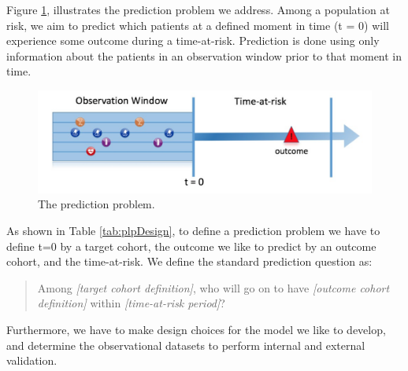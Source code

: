 \documentclass[11pt]{book}
\theoremstyle{definition}
\theoremstyle{definition}
\theoremstyle{definition}
\theoremstyle{remark}
\begin{document}
Figure \ref{fig:figure1}, illustrates the prediction problem we address. Among a population at risk, we aim to predict which patients at a defined moment in time (t = 0) will experience some outcome during a time-at-risk. Prediction is done using only information about the patients in an observation window prior to that moment in time.

\begin{figure}
\includegraphics[width=1\linewidth]{images/PatientLevelPrediction/Figure1} \caption{The prediction problem.}\label{fig:figure1}
\end{figure}

As shown in Table \ref{tab:plpDesign}, to define a prediction problem we have to define t=0 by a target cohort, the outcome we like to predict by an outcome cohort, and the time-at-risk. We define the standard prediction question as:   

\begin{quote}
Among \emph{{[}target cohort definition{]}}, who will go on to have \emph{{[}outcome cohort definition{]}} within \emph{{[}time-at-risk period{]}}?
\end{quote}

Furthermore, we have to make design choices for the model we like to develop, and determine the observational datasets to perform internal and external validation.
\end{document}
